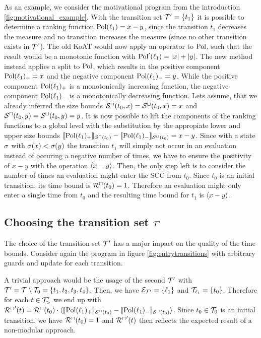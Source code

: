 




As an example, we consider the motivational program from the introduction \ref{fig:motivational_example}.
With the transition set $\mathcal{T}' = \lbrace t_1 \rbrace$ it is possible to determine a ranking function $\text{Pol}(\ell_1) = x - y$, since the transition $t_1$ decreases the measure and no transition increases the measure (since no other transition exists in $\mathcal{T}'$).
The old KoAT would now apply an operator to $\text{Pol}$, such that the result would be a monotonic function with $\text{Pol}'(\ell_1) = \left|x\right| + \left|y\right|$.
The new method instead applies a split to $\text{Pol}$, which results in the positive component $\text{Pol}(\ell_1)_+ = x$ and the negative component $\text{Pol}(\ell_1)_- = y$.
While the positive component $\text{Pol}(\ell_1)_+$ is a monotonically increasing function, the negative component $\text{Pol}(\ell_1)_-$ is a monotonically decreasing function.
Lets assume, that we already inferred the size bounds ${\mathcal{S}^\sqcap}(t_0,x) = {\mathcal{S}^\sqcup}(t_0,x) = x$ and ${\mathcal{S}^\sqcap}(t_0,y) = {\mathcal{S}^\sqcup}(t_0,y) = y$.
It is now possible to lift the components of the ranking functions to a global level with the substitution by the appropiate lower and upper size bounds $\llbracket \text{Pol}(\ell_1)_+ \rrbracket_{{\mathcal{S}^\sqcap}(t_0)} - \llbracket \text{Pol}(\ell_1)_- \rrbracket_{{\mathcal{S}^\sqcup}(t_0)} = x - y$.
Since with a state $\sigma$ with $\sigma(x) < \sigma(y)$ the transition $t_1$ will simply not occur in an evaluation instead of occuring a negative number of times, we have to ensure the positivity of $x - y$ with the operation $\langle x - y\rangle$.
Then, the only step left is to consider the number of times an evaluation might enter the SCC from $t_0$.
Since $t_0$ is an initial transition, its time bound is ${\mathcal{R}^\sqcap}(t_0) = 1$.
Therefore an evaluation might only enter a single time from $t_0$ and the resulting time bound for $t_1$ is $\langle x - y\rangle$.

\subsection{Choosing the transition set $\mathcal{T}'$}

The choice of the transition set $\mathcal{T}'$ has a major impact on the quality of the time bounds.
Consider again the program in figure \ref{fig:entrytransitions} with arbitrary guards and update for each transition.

A trivial approach would be the usage of the second $\mathcal{T}'$ with $\mathcal{T}' = \mathcal{T} \setminus \mathcal{T}_0 = \lbrace t_1, t_2, t_3, t_4 \rbrace$.
Then, we have $\mathcal{E}_{\mathcal{T}'} = \lbrace \ell_1 \rbrace$ and $\mathcal{T}_{\ell_1} = \lbrace t_0 \rbrace$.
Therefore for each $t \in \mathcal{T}'_>$ we end up with ${\mathcal{R}^\sqcap}'(t) = {\mathcal{R}^\sqcap}(t_0) \cdot \langle\llbracket \text{Pol}(\ell_1)_+ \rrbracket_{{\mathcal{S}^\sqcap}(t_0)} - \llbracket \text{Pol}(\ell_1)_- \rrbracket_{{\mathcal{S}^\sqcup}(t_0)}\rangle$.
Since $t_0 \in \mathcal{T}_0$ is an initial transition, we have ${\mathcal{R}^\sqcap}(t_0) = 1$ and ${\mathcal{R}^\sqcap}'(t)$ then reflects the expected result of a non-modular approach.

